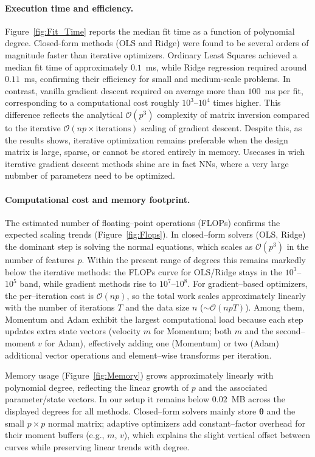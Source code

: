 \documentclass[
 reprint,            %
 amsmath,amssymb,
 aps,
]{revtex4-2}
\begin{document}
\paragraph*{Execution time and efficiency.}
Figure~\ref{fig:Fit_Time} reports the median fit time as a function of polynomial degree.
Closed-form methods (OLS and Ridge) were found to be several orders of magnitude faster than iterative optimizers.
Ordinary Least Squares achieved a median fit time of approximately $0.1$~ms, while Ridge regression required around $0.11$~ms, confirming their efficiency for small and medium-scale problems.
In contrast, vanilla gradient descent required on average more than $100$~ms per fit, corresponding to a computational cost roughly $10^3$--$10^4$ times higher.
This difference reflects the analytical $\mathcal{O}(p^3)$ complexity of matrix inversion compared to the iterative $\mathcal{O}(n p \times \text{iterations})$ \cite{golubvanloan2013,bottou2010largeScaleSGD} scaling of gradient descent.
Despite this, as the results shows, iterative optimization remains preferable when the design matrix is large, sparse, or cannot be stored entirely in memory.
Usecases in wich iterative gradient descent methods shine are in fact NNs, where a very large nubmber of parameters need to be optimized\cite{goodfellow2016}.



\paragraph*{Computational cost and memory footprint.}
The estimated number of floating–point operations (FLOPs) confirms the expected scaling trends (Figure~\ref{fig:Flops}). In closed–form solvers (OLS, Ridge) the dominant step is solving the normal equations, which scales as $\mathcal{O}(p^3)$ in the number of features $p$. Within the present range of degrees this remains markedly below the iterative methods: the FLOPs curve for OLS/Ridge stays in the $10^3$–$10^5$ band, while gradient methods rise to $10^7$–$10^8$.
For gradient–based optimizers, the per–iteration cost is $\mathcal{O}(np)$, so the total work scales approximately linearly with the number of iterations $T$ and the data size $n$ ($\sim\mathcal{O}(n p T)$). Among them, Momentum and Adam exhibit the largest computational load because each step updates extra state vectors\cite{polyak1964heavyball,kingma2015adam} (velocity $m$ for Momentum; both $m$ and the second–moment $v$ for Adam), effectively adding one (Momentum) or two (Adam) additional vector operations and element–wise transforms per iteration.

Memory usage (Figure~\ref{fig:Memory}) grows approximately linearly with polynomial degree, reflecting the linear growth of $p$ and the associated parameter/state vectors. In our setup it remains below $0.02$~MB across the displayed degrees for all methods. Closed–form solvers mainly store $\boldsymbol{\theta}$ and the small $p\times p$ normal matrix; adaptive optimizers add constant–factor overhead for their moment buffers (e.g., $m$, $v$), which explains the slight vertical offset between curves while preserving linear trends with degree.

\end{document}
